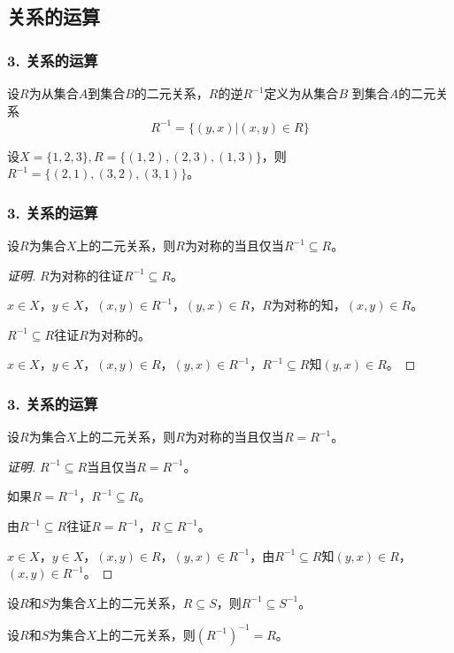 \documentclass{beamer}
\begin{document}
\begin{CJK*}{UTF8}{gbsn}
\section{关系的运算}
\begin{frame}
  \frametitle{3. 关系的运算}
  \begin{Def}
    设$R$为从集合$A$到集合$B$的二元关系，$R$的\alert{逆}$R^{-1}$定义为从集合$B$
    到集合$A$的二元关系
    \[R^{-1}=\{(y,x)|(x,y)\in R\}\]
  \end{Def}\pause
  \begin{Ex}
    设$X=\{1,2,3\}, R=\{(1,2),(2,3),(1,3)\}$，则$R^{-1}=\{(2,1),(3,2),(3,1)\}$。
  \end{Ex}
\end{frame}
\begin{frame}
  \frametitle{3. 关系的运算}
    \begin{Thm}
    设$R$为集合$X$上的二元关系，则$R$为对称的当且仅当$R^{-1}\subseteq R$。
  \end{Thm} \pause 
\begin{proof}[证明]\justifying\let\raggedright\justifying
{}$R$为对称的往证$R^{-1}\subseteq R$。

$x\in X$，$y\in X$，$(x,y)\in R^{-1}$，$(y,x)\in R$，$R$为对称的知，\pause$(x,y)\in R$。

$R^{-1}\subseteq R$往证$R$为对称的。

$x\in X$，$y\in X$，$(x,y)\in R$，$(y,x)\in R^{-1}$，$R^{-1}\subseteq R$知$(y,x)\in R$。

\end{proof}
\end{frame}
\begin{frame}
  \frametitle{3. 关系的运算}
  \begin{Thm}
    设$R$为集合$X$上的二元关系，则$R$为对称的当且仅当$R=R^{-1}$。
  \end{Thm}  
  \pause
  \begin{proof}[证明]\justifying\let\raggedright\justifying
    $R^{-1}\subseteq R$当且仅当$R=R^{-1}$。

    \pause 如果$R=R^{-1}$，$R^{-1}\subseteq R$。

    \pause 由$R^{-1}\subseteq R$往证$R=R^{-1}$，$R\subseteq R^{-1}$。

    $x\in X$，\pause $y\in X$，$(x,y)\in R$，$(y,x)\in R^{-1}$，\pause 由$R^{-1}\subseteq R$知$(y,x)\in R$，$(x,y)\in R^{-1}$。
  \end{proof}
\pause
  \begin{Thm}
    设$R$和$S$为集合$X$上的二元关系，$R\subseteq S$，则$R^{-1}\subseteq S^{-1}$。
  \end{Thm}  
\pause
  \begin{Thm}
    设$R$和$S$为集合$X$上的二元关系，则$(R^{-1})^{-1}=R$。
  \end{Thm}  
\end{frame}




\end{CJK*}
\end{document}
